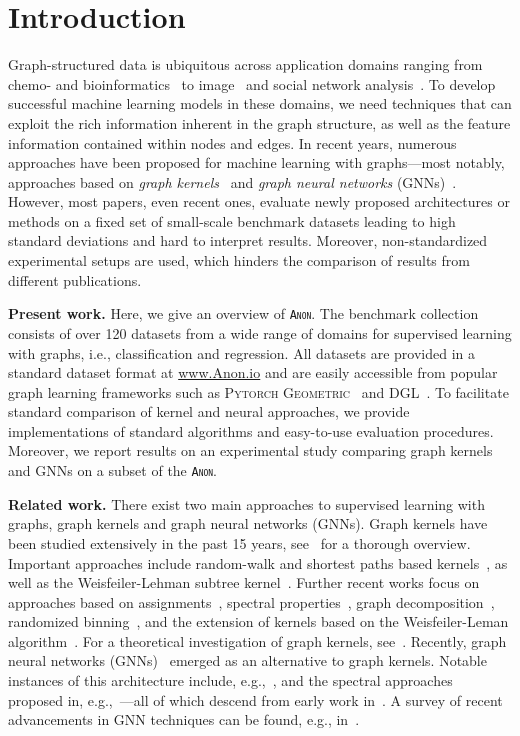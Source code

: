 \documentclass{article}
\newcommand{\xhdr}[1]{{\noindent\bfseries #1}}
\theoremstyle{definition}
\newcommand{\new}[1]{\emph{#1}}
\begin{document}
\section{Introduction}
Graph-structured data is ubiquitous across application domains ranging from chemo- and bioinformatics~\cite{Barabasi2004,Sto+2020} to image~\cite{Sim+2017} and social network analysis~\cite{Eas+2010}. To develop successful machine learning models in these domains, we need techniques that can exploit the rich information inherent in the graph structure, as well as the feature information contained within nodes and edges. In recent years, numerous approaches have been proposed for machine learning with graphs---most notably, approaches based on \new{graph kernels}~\cite{Kri+2019} and \new{graph neural networks} (GNNs)~\cite{Gil+2017}. However, most papers, even recent ones, evaluate newly proposed architectures or methods on a fixed set of small-scale benchmark datasets leading to high standard deviations and hard to interpret results. 
Moreover, non-standardized experimental setups are used, which hinders the comparison of results from different publications.

\xhdr{Present work.} 
Here, we give an overview of \textsc{\texttt{Anon}}. The benchmark collection consists of over 120 datasets from a wide range of domains for supervised learning with graphs, i.e., classification and regression. All datasets are provided in a standard dataset format at \url{www.Anon.io} and are easily accessible from popular graph learning frameworks such as \textsc{Pytorch Geometric}~\cite{Fey+2019} and \textsc{DGL}~\cite{Wan+2019}. To facilitate standard comparison of kernel and neural approaches, we provide implementations of standard algorithms and easy-to-use evaluation procedures. Moreover, we report results on an experimental study comparing graph kernels and GNNs on a subset of the \textsc{\texttt{Anon}}.

\xhdr{Related work.}
There exist two main approaches to supervised learning with graphs, graph kernels and graph neural networks (GNNs). Graph kernels have been studied extensively in the past 15 years, see~\cite{Kri+2019} for a thorough overview. Important approaches include random-walk and shortest paths based kernels~\cite{Gae+2003,Sugiyama2015,Bor+2005,Kri+2017b}, as well as the Weisfeiler-Lehman subtree kernel~\cite{She+2011,Mor+2017}. 
Further recent works focus on approaches based on assignments~\cite{Kri+2016,Nik+2017}, spectral properties~\cite{Kon+2016}, graph decomposition~\cite{Nik+2018}, randomized binning~\cite{Hei+2019}, and the extension of kernels based on the Weisfeiler-Leman algorithm~\cite{Tog+2019, Rie+2019}. For a theoretical investigation of graph kernels, see~\cite{Kri+2018}. Recently, graph neural networks (GNNs)~\cite{Gil+2017,Sca+2009} emerged as an alternative to graph kernels. Notable instances of this architecture include, e.g.,~\cite{Duv+2015,Ham+2017,Vel+2018}, and the spectral approaches proposed in, e.g.,~\cite{Bru+2014,Def+2015,Kip+2017,Mon+2017}---all of which descend from early work in~\cite{Kir+1995,Mer+2005,Spe+1997,Sca+2009}. A survey of recent advancements in GNN techniques can be found, e.g., in~\cite{Cha+2020,Wu+2019,Zho+2018}.
\end{document}
